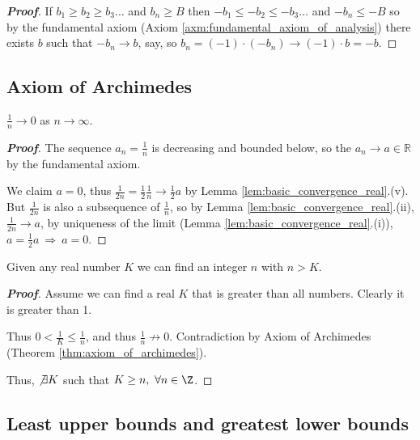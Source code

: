 \begin{proof}[\bf Proof]
If $b_1 \geq b_2 \geq b_3 \ldots $ and $b_n \geq B$ then $-b_1 \leq -b_2 \leq -b_3 \ldots$ and $-b_n \leq -B$ so by the fundamental axiom (Axiom \ref{axm:fundamental_axiom_of_analysis}) there exists $b$ such that $-b_n \rightarrow b$, say, so $b_n = (-1)\cdot(-b_n) \rightarrow (-1)\cdot b = - b$.
\end{proof}





\subsection{Axiom of Archimedes}

\begin{theorem}\label{thm:axiom_of_archimedes}
$\frac 1n\to 0$ as $n\to \infty$.
\end{theorem}

\begin{proof}[{\bf Proof}]
The sequence $a_n=\frac 1n$ is decreasing and bounded below, so the $a_n\to a\in\mathbb{R}$ by the fundamental axiom.

We claim $a=0$, thus $\frac{1}{2n}=\frac 12 \frac1n\to \frac 12a$ by Lemma \ref{lem:basic_convergence_real}.(v). But $\frac{1}{2n}$ is also a subsequence of $\frac 1n$, so by Lemma \ref{lem:basic_convergence_real}.(ii), $\frac{1}{2n}\to a$, by uniqueness of the limit (Lemma \ref{lem:basic_convergence_real}.(i)), $a=\frac 12a\ \Rightarrow \ a=0$.
\end{proof}

\begin{corollary}
Given any real number $K$ we can find an integer $n$ with $n>K$.
\end{corollary}

\begin{proof}[\bf Proof]
Assume we can find a real $K$ that is greater than all numbers. Clearly it is greater than 1.

Thus $0 < \frac{1}{K} \leq \frac{1}{n}$, and thus $\frac{1}{n} \not\to 0$. Contradiction by Axiom of Archimedes (Theorem \ref{thm:axiom_of_archimedes}).

Thus, $\not\exists K$ such that $K \geq n, \ \forall n \in \Z$.
\end{proof}

\subsection{Least upper bounds and greatest lower bounds}

